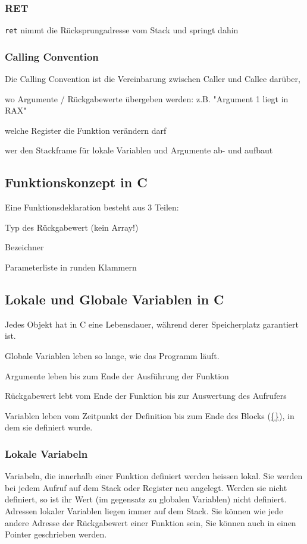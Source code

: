 \documentclass[8pt,landscape,a4paper]{scrartcl}
\begin{document}
\begin{multicols*}{5}
\subsubsection{RET}
\texttt{ret} nimmt die Rücksprungadresse vom Stack und springt dahin
\subsubsection{Calling Convention}
Die Calling Convention ist die Vereinbarung zwischen Caller und Callee darüber,
\begin{compactitem} [$\bullet$]
\item wo Argumente / Rückgabewerte übergeben werden: z.B. "Argument 1 liegt in RAX"
\item welche Register die Funktion verändern darf
\item wer den Stackframe für lokale Variablen und Argumente ab- und aufbaut

\end{compactitem}
\subsection{Funktionskonzept in C}
Eine Funktionsdeklaration besteht aus 3 Teilen:
\begin{compactitem} [$\bullet$]
	\item Typ des Rückgabewert (kein Array!)
	\item Bezeichner
	\item Parameterliste in runden Klammern
\end{compactitem}
\subsection{Lokale und Globale Variablen in C}
Jedes Objekt hat in C eine Lebensdauer, während derer Speicherplatz garantiert ist.
\begin{compactitem} [$\bullet$]
	\item \textcolor{b}{Globale Variablen} leben so lange, wie das Programm läuft.
	\item \textcolor{b}{Argumente} leben bis zum Ende der Ausführung der Funktion
	\item \textcolor{b}{Rückgabewert} lebt vom Ende der Funktion bis zur Auswertung des Aufrufers
	\item \textcolor{b}{Variablen} leben vom Zeitpunkt der Definition bis zum Ende des Blocks (\underline{\{\}}), in dem sie definiert wurde.
\end{compactitem}
\subsubsection{Lokale Variabeln}
Variabeln, die innerhalb einer Funktion definiert werden heissen lokal. Sie werden bei jedem Aufruf auf dem Stack oder Register neu angelegt. Werden sie nicht definiert, so ist ihr Wert (im gegensatz zu globalen Variablen) nicht definiert. Adressen lokaler Variablen liegen immer auf dem Stack. Sie können wie jede andere Adresse der Rückgabewert einer Funktion sein, Sie können auch in einen Pointer geschrieben werden.

\end{multicols*}
\end{document}
